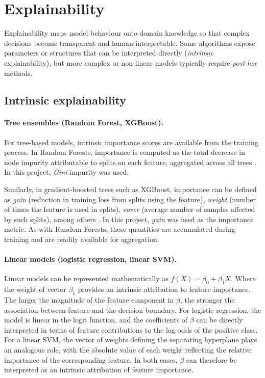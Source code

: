 \section{Explainability}\label{sec:method-explainability}
Explainability maps model behaviour onto domain knowledge so that complex decisions become transparent and human-interpretable. Some algorithms expose parameters or structures that can be interpreted directly (\emph{intrinsic} explainability), but more complex or non-linear models typically require \emph{post-hoc} methods.

\subsection{Intrinsic explainability}\label{subsec:method-intrinsic-explainability}
\paragraph{Tree ensembles (Random Forest, XGBoost).}
For tree-based models, intrinsic importance scores are available from the training process. In Random Forests, importance is computed as the total decrease in node impurity attributable to splits on each feature, aggregated across all trees \citep{Breiman2001}. In this project, \emph{Gini} impurity was used.

Similarly, in gradient-boosted trees such as XGBoost, importance can be defined as \emph{gain} (reduction in training loss from splits using the feature), \emph{weight} (number of times the feature is used in splits), \emph{cover} (average number of samples affected by such splits), among others \citep{chen2016xgboost}. In this project, \emph{gain} was used as the importance metric. As with Random Forests, these quantities are accumulated during training and are readily available for aggregation.

\paragraph{Linear models (logistic regression, linear SVM).}
Linear models can be represented mathematically as $f(X) = \beta_0 + \beta_1X$. Where the weight of vector $\beta_1$ provides an intrinsic attribution to feature importance. The larger the magnitude of the feature component in $\beta$, the stronger the association between feature and the decision boundary. For logistic regression, the model is linear in the logit function, and the coefficients of $\beta$ can be directly interpreted in terms of feature contributions to the log-odds of the positive class. For a linear SVM, the vector of weights defining the separating hyperplane plays an analogous role, with the absolute value of each weight reflecting the relative importance of the corresponding feature. In both cases, $\beta$ can therefore be interpreted as an intrinsic attribution of feature importance.

